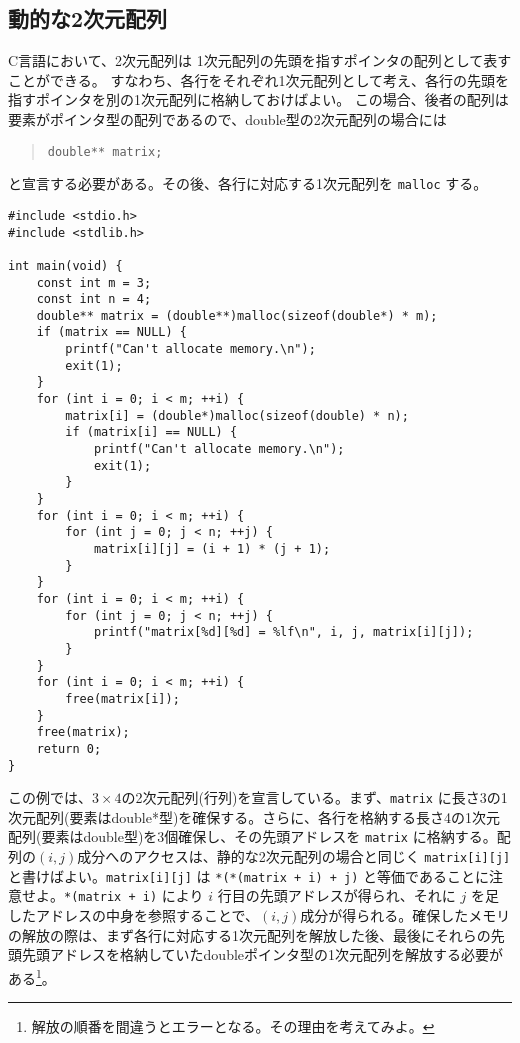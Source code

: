 \subsection{動的な2次元配列}

C言語において、2次元配列は 1次元配列の先頭を指すポインタの配列として表すことができる。
すなわち、各行をそれぞれ1次元配列として考え、各行の先頭を指すポインタを別の1次元配列に格納しておけばよい。
この場合、後者の配列は要素がポインタ型の配列であるので、double型の2次元配列の場合には
\begin{quote}
    \begin{verbatim}
double** matrix;
\end{verbatim}
\end{quote}
と宣言する必要がある。その後、各行に対応する1次元配列を \texttt{malloc} する。
\begin{reidai}\label{ex:malloc-2dim}
    \begin{verbatim}
#include <stdio.h>
#include <stdlib.h>

int main(void) {
    const int m = 3;
    const int n = 4;
    double** matrix = (double**)malloc(sizeof(double*) * m);
    if (matrix == NULL) {
        printf("Can't allocate memory.\n");
        exit(1);
    }
    for (int i = 0; i < m; ++i) {
        matrix[i] = (double*)malloc(sizeof(double) * n);
        if (matrix[i] == NULL) {
            printf("Can't allocate memory.\n");
            exit(1);
        }
    }
    for (int i = 0; i < m; ++i) {
        for (int j = 0; j < n; ++j) {
            matrix[i][j] = (i + 1) * (j + 1);
        }
    }
    for (int i = 0; i < m; ++i) {
        for (int j = 0; j < n; ++j) {
            printf("matrix[%d][%d] = %lf\n", i, j, matrix[i][j]);
        }
    }
    for (int i = 0; i < m; ++i) {
        free(matrix[i]);
    }
    free(matrix);
    return 0;
}
\end{verbatim}
\end{reidai} \noindent
この例では、\(3 \times 4\)の2次元配列(行列)を宣言している。まず、\texttt{matrix} に長さ3の1次元配列(要素はdouble*型)を確保する。さらに、各行を格納する長さ4の1次元配列(要素はdouble型)を3個確保し、その先頭アドレスを \texttt{matrix} に格納する。配列の\((i,j)\)成分へのアクセスは、静的な2次元配列の場合と同じく \texttt{matrix[i][j]} と書けばよい。\texttt{matrix[i][j]} は \texttt{*(*(matrix + i) + j)} と等価であることに注意せよ。\texttt{*(matrix + i)} により \(i\) 行目の先頭アドレスが得られ、それに \(j\) を足したアドレスの中身を参照することで、\((i,j)\)成分が得られる。確保したメモリの解放の際は、まず各行に対応する1次元配列を解放した後、最後にそれらの先頭先頭アドレスを格納していたdoubleポインタ型の1次元配列を解放する必要がある\footnote{解放の順番を間違うとエラーとなる。その理由を考えてみよ。}。

